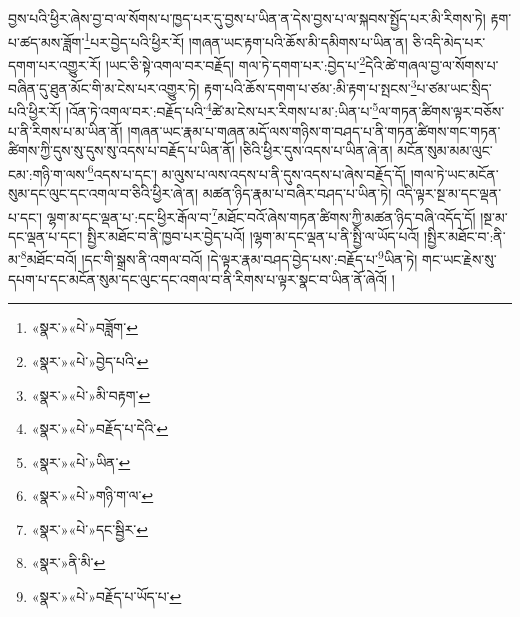 བྱས་པའི་ཕྱིར་ཞེས་བྱ་བ་ལ་སོགས་པ་ཁྱད་པར་དུ་བྱས་པ་ཡིན་ན་དེས་བྱས་པ་ལ་སྐབས་སྤྱོད་པར་མི་རིགས་ཏེ། རྟག་པ་ཚད་མས་ཟློག་\footnote{«སྣར་»«པེ་»བཟློག་}པར་བྱེད་པའི་ཕྱིར་རོ། །གཞན་ཡང་རྟག་པའི་ཆོས་མི་དམིགས་པ་ཡིན་ན། ཅི་འདི་མེད་པར་དགག་པར་འགྱུར་རོ། །ཡང་ཅི་སྟེ་འགལ་བར་བརྗོད། གལ་ཏེ་དགག་པར་:བྱེད་པ་\footnote{«སྣར་»«པེ་»བྱེད་པའི་}དེའི་ཚེ་གཞལ་བྱ་ལ་སོགས་པ་བཞིན་དུ་ཐུན་མོང་གི་མ་ངེས་པར་འགྱུར་ཏེ། རྟག་པའི་ཆོས་དགག་པ་ཙམ་:མི་རྟག་པ་སྤངས་\footnote{«སྣར་»«པེ་»མི་བརྟག་}པ་ཙམ་ཡང་སྲིད་པའི་ཕྱིར་རོ། །འོན་ཏེ་འགལ་བར་:བརྗོད་པའི་\footnote{«སྣར་»«པེ་»བརྗོད་པ་དེའི་}ཚེ་མ་ངེས་པར་རིགས་པ་མ་:ཡིན་པ་\footnote{«སྣར་»«པེ་»ཡིན་}ལ་གཏན་ཚིགས་ལྟར་བཅོས་པ་ནི་རིགས་པ་མ་ཡིན་ནོ། །གཞན་ཡང་རྣམ་པ་གཞན་མདོ་ལས་གཉིས་ག་བཤད་པ་ནི་གཏན་ཚིགས་གང་གཏན་ཚིགས་ཀྱི་དུས་སུ་དུས་སུ་འདས་པ་བརྗོད་པ་ཡིན་ནོ། །ཅིའི་ཕྱིར་དུས་འདས་པ་ཡིན་ཞེ་ན། མངོན་སུམ་མམ་ལུང་ངམ་:གཉི་ག་ལས་\footnote{«སྣར་»«པེ་»གཉི་ག་ལ་}འདས་པ་དང་། མ་ལུས་པ་ལས་འདས་པ་ནི་དུས་འདས་པ་ཞེས་བརྗོད་དོ། །གལ་ཏེ་ཡང་མངོན་སུམ་དང་ལུང་དང་འགལ་བ་ཅིའི་ཕྱིར་ཞེ་ན། མཚན་ཉིད་རྣམ་པ་བཞིར་བཤད་པ་ཡིན་ཏེ། འདི་ལྟར་སྔ་མ་དང་ལྡན་པ་དང་། ལྷག་མ་དང་ལྡན་པ་:དང་ཕྱིར་རྒོལ་བ་\footnote{«སྣར་»«པེ་»དང་སྦྱིར་}མཐོང་བའོ་ཞེས་གཏན་ཚིགས་ཀྱི་མཚན་ཉིད་བཞི་འདོད་དོ། །སྔ་མ་དང་ལྡན་པ་དང་། སྤྱིར་མཐོང་བ་ནི་ཁྱབ་པར་བྱེད་པའོ། །ལྷག་མ་དང་ལྡན་པ་ནི་སྤྱི་ལ་ཡོད་པའོ། །སྤྱིར་མཐོང་བ་:ནི་མ་\footnote{«སྣར་»ནི་མི་}མཐོང་བའོ། །དང་གི་སྒྲས་ནི་འགལ་བའོ། །དེ་ལྟར་རྣམ་བཤད་བྱེད་པས་:བརྗོད་པ་\footnote{«སྣར་»«པེ་»བརྗོད་པ་ཡོད་པ་}ཡིན་ཏེ། གང་ཡང་རྗེས་སུ་དཔག་པ་དང་མངོན་སུམ་དང་ལུང་དང་འགལ་བ་ནི་རིགས་པ་ལྟར་སྣང་བ་ཡིན་ནོ་ཞེའོ། །
